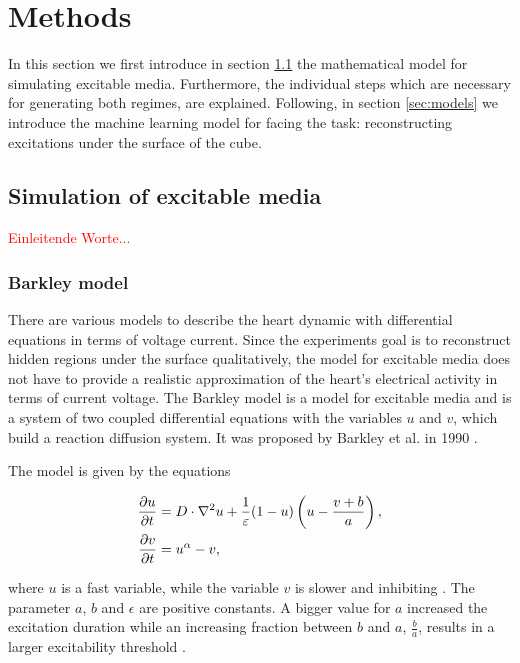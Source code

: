 \section{Methods}\label{sec:methods}

In this section we first introduce in section \ref{sec:exmedia} the mathematical model for simulating excitable media. Furthermore, the individual steps which are necessary for generating both regimes, are explained. 
Following, in section \ref{sec:models} we introduce the machine learning model for facing the task: reconstructing excitations under the surface of the cube.

\subsection{Simulation of excitable media}\label{sec:exmedia}
\textcolor{red}{Einleitende Worte...}
\subsubsection*{Barkley model}
There are various models to describe the heart dynamic with differential equations in terms of voltage current. Since the experiments goal is to reconstruct hidden regions under the surface qualitatively, the model for excitable media does not have to provide a realistic approximation of the heart's electrical activity in terms of current voltage. The Barkley model is a model for excitable media and is a system of two coupled differential equations with the variables $u$ and $v$, which build a reaction diffusion system. It was proposed by Barkley et al. in 1990 \cite{barkley_spiral_wave_1990}.

The model is given by the equations

\begin{align}
    \frac{\partial u}{\partial t}&=D\cdot \nabla^2u+\frac{1}{\varepsilon}(1-u)\left(u-\frac{v+b}{a}\right),\notag\\
    \frac{\partial v}{\partial t}&=u^{\alpha}-v,\notag\\
    \label{eq:barkley}
\end{align}

where $u$ is a fast variable, while the variable $v$ is slower and inhibiting \cite{berg_synchronization_2011}.
The parameter $a$, $b$ and $\epsilon$ are positive constants. A bigger value for $a$ increased the excitation duration while an increasing fraction between $b$ and $a$, $\frac{b}{a}$, results in a larger excitability threshold \cite{Barkley_2008}. 

